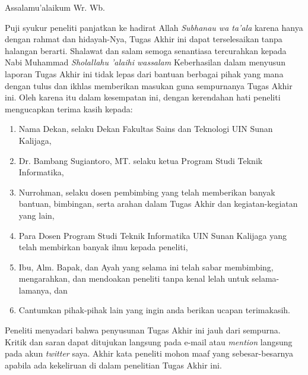 \documentclass{tif-uin-suka}
\def \writerlabel{peneliti}
\def \writerlabelCap{Peneliti}
\begin{document}
\cover

\approvalpage
\restoregeometry

\preface
Assalamu'alaikum Wr. Wb.

\vspace{0.5cm}

Puji syukur {\writerlabel} panjatkan ke hadirat Allah \textit{Subhanau wa ta'ala} karena hanya dengan rahmat dan hidayah-Nya, Tugas Akhir ini dapat terselesaikan tanpa halangan berarti. Shalawat dan salam semoga senantiasa tercurahkan kepada Nabi Muhammad \textit{Sholallahu 'alaihi wassalam} Keberhasilan dalam menyusun laporan Tugas Akhir ini tidak lepas dari bantuan berbagai pihak yang mana dengan tulus dan ikhlas memberikan masukan guna sempurnanya Tugas Akhir ini. Oleh karena itu dalam kesempatan ini, dengan kerendahan hati {\writerlabel} mengucapkan terima kasih kepada:

\begin{enumerate}
\item{Nama Dekan, selaku Dekan Fakultas Sains dan Teknologi UIN Sunan Kalijaga,}
\item{Dr. Bambang Sugiantoro, MT. selaku ketua Program Studi Teknik Informatika,}
\item{Nurrohman, selaku dosen pembimbing yang telah memberikan banyak bantuan, bimbingan, serta arahan dalam Tugas Akhir dan kegiatan-kegiatan yang lain,}
\item{Para Dosen Program Studi Teknik Informatika UIN Sunan Kalijaga yang telah membirkan banyak ilmu kepada {\writerlabel},}
\item{Ibu, Alm. Bapak, dan Ayah yang selama ini telah sabar membimbing, mengarahkan, dan mendoakan {\writerlabel} tanpa kenal lelah untuk selama-lamanya, dan}
\item{Cantumkan pihak-pihak lain yang ingin anda berikan ucapan terimakasih.}
\end{enumerate}

{\writerlabelCap} menyadari bahwa penyusunan Tugas Akhir ini jauh dari sempurna. Kritik dan saran dapat ditujukan langsung pada e-mail atau \emph{mention} langsung pada akun \emph{twitter} saya. Akhir kata {\writerlabel} mohon maaf yang sebesar-besarnya apabila ada kekeliruan di dalam {\writerlabel}an Tugas Akhir ini.

\vspace{0.5cm}
\end{document}
